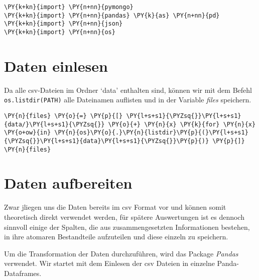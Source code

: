 
    

\begin{tcolorbox}[breakable, size=fbox, boxrule=1pt, pad at break*=1mm,colback=cellbackground, colframe=cellborder]
\begin{Verbatim}[commandchars=\\\{\}]
\PY{k+kn}{import} \PY{n+nn}{pymongo}
\PY{k+kn}{import} \PY{n+nn}{pandas} \PY{k}{as} \PY{n+nn}{pd}
\PY{k+kn}{import} \PY{n+nn}{json}
\PY{k+kn}{import} \PY{n+nn}{os}
\end{Verbatim}
\end{tcolorbox}

    \hypertarget{daten-einlesen}{%
\section{Daten einlesen}\label{daten-einlesen}}

    Da alle csv-Dateien im Ordner `data' enthalten sind, können wir mit dem
Befehl \texttt{os.listdir(PATH)} alle Dateinamen auflisten und in der
Variable \emph{files} speichern.

\begin{tcolorbox}[breakable, size=fbox, boxrule=1pt, pad at break*=1mm,colback=cellbackground, colframe=cellborder]
\begin{Verbatim}[commandchars=\\\{\}]
\PY{n}{files} \PY{o}{=} \PY{p}{[} \PY{l+s+s1}{\PYZsq{}}\PY{l+s+s1}{data/}\PY{l+s+s1}{\PYZsq{}} \PY{o}{+} \PY{n}{x} \PY{k}{for} \PY{n}{x} \PY{o+ow}{in} \PY{n}{os}\PY{o}{.}\PY{n}{listdir}\PY{p}{(}\PY{l+s+s1}{\PYZsq{}}\PY{l+s+s1}{data}\PY{l+s+s1}{\PYZsq{}}\PY{p}{)} \PY{p}{]}
\PY{n}{files}
\end{Verbatim}
\end{tcolorbox}

    \hypertarget{daten-aufbereiten}{%
\section{Daten aufbereiten}\label{daten-aufbereiten}}

    Zwar jliegen uns die Daten bereits im csv Format vor und können somit
theoretisch direkt verwendet werden, für spätere Auswertungen ist es
dennoch sinnvoll einige der Spalten, die aus zusammengesetzten
Informationen bestehen, in ihre atomaren Bestandteile aufzuteilen und
diese einzeln zu speichern.

Um die Transformation der Daten durchzuführen, wird das Package
\emph{Pandas} verwendet. Wir startet mit dem Einlesen der csv Dateien in
einzelne Panda-Dataframes.

